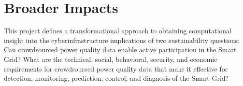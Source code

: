 
\section{Broader Impacts}
\label{sec:merit}




This project defines a transformational approach to obtaining computational insight into the cyberinfrastructure implications of two sustainability questions: Can crowdsourced power quality data enable active participation in the Smart Grid?  What are the technical, social, behavioral, security, and economic requirements for crowdsourced power quality data that make it effective for detection, monitoring, prediction, control, and diagnosis of the Smart Grid?

